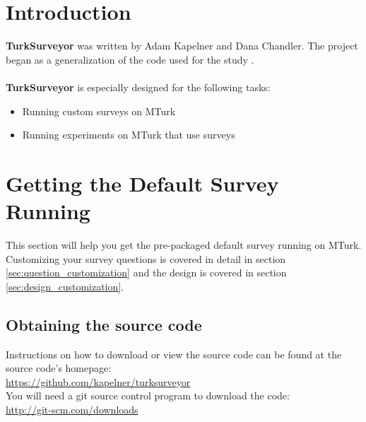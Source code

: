\documentclass[12pt]{article}
\author{Adam Kapelner}
\begin{document}
\maketitle

\tableofcontents
\pagebreak

\section{Introduction}\label{sec:introduction}

\textbf{TurkSurveyor} was written by Adam Kapelner and Dana Chandler. The project began as a generalization of the code used for the study \citet{KapelnerChandler2010}.\\
\\
\textbf{TurkSurveyor} is especially designed for the following tasks:

\begin{itemize}
\item Running custom surveys on MTurk
\item Running experiments on MTurk that use surveys
\end{itemize}

\section{Getting the Default Survey Running}

This section will help you get the pre-packaged default survey running on MTurk. Customizing your survey questions is covered in detail in section \ref{sec:question_customization} and the design is covered in section \ref{sec:design_customization}.

\subsection{Obtaining the source code}

Instructions on how to download or view the source code can be found at the source code's homepage:\\

\href{https://github.com/kapelner/turksurveyor}{https://github.com/kapelner/turksurveyor}\\

You will need a git source control program to download the code:\\

\href{http://git-scm.com/downloads}{http://git-scm.com/downloads}
\end{document}
